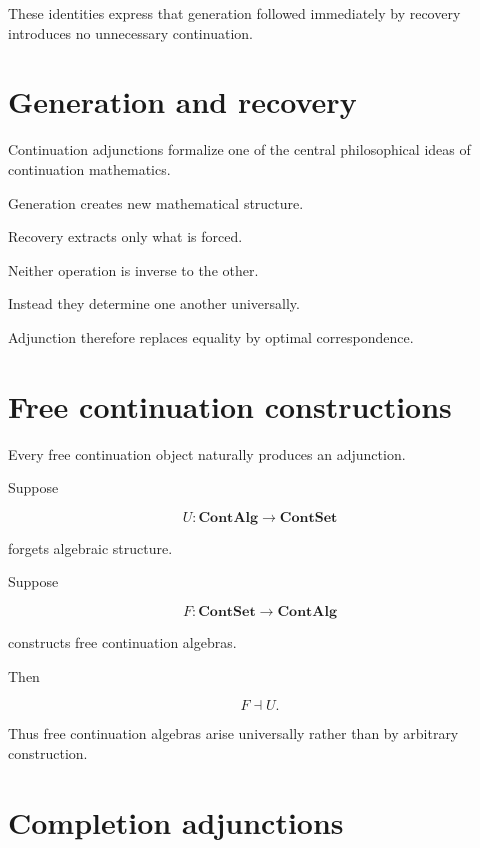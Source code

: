 \documentclass[13pt,openany]{book}
\theoremstyle{plain}
\theoremstyle{definition}
\begin{document}
These identities express that generation followed immediately by recovery
introduces no unnecessary continuation.

\section{Generation and recovery}

Continuation adjunctions formalize one of the central philosophical ideas of
continuation mathematics.

Generation creates new mathematical structure.

Recovery extracts only what is forced.

Neither operation is inverse to the other.

Instead they determine one another universally.

Adjunction therefore replaces equality by optimal correspondence.

\section{Free continuation constructions}

Every free continuation object naturally produces an adjunction.

Suppose

\[
U:\mathbf{ContAlg}
\rightarrow
\mathbf{ContSet}
\]

forgets algebraic structure.

Suppose

\[
F:\mathbf{ContSet}
\rightarrow
\mathbf{ContAlg}
\]

constructs free continuation algebras.

Then

\[
F\dashv U.
\]

Thus free continuation algebras arise universally rather than by arbitrary
construction.

\section{Completion adjunctions}
\end{document}
